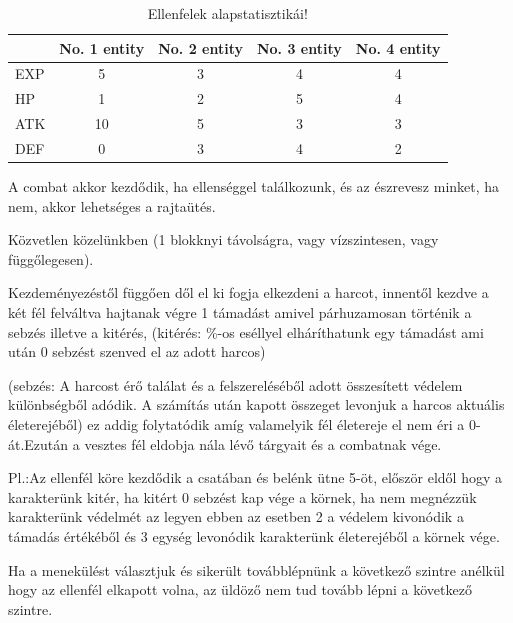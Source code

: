 \begin{table}[h]
\centering
\caption{Ellenfelek alapstatisztikái!}
\label{tab:minta}
\begin{tabular}{|l|c|c|c|c|}
\hline
 & No. 1 entity & No. 2 entity & No. 3 entity & No. 4 entity  \\
\hline
EXP & 5 & 3 & 4 & 4 \\
\hline
HP & 1 & 2 & 5 & 4 \\
\hline
ATK & 10 & 5 & 3 & 3 \\
\hline
DEF & 0 & 3 & 4 & 2 \\
\hline
\end{tabular}
\end{table}


A combat akkor kezdődik, ha ellenséggel találkozunk, és az észrevesz minket, ha nem, akkor lehetséges a rajtaütés.


Közvetlen közelünkben (1 blokknyi távolságra, vagy vízszintesen, vagy függőlegesen).

Kezdeményezéstől függően dől el ki fogja elkezdeni a harcot, innentől kezdve a két fél felváltva hajtanak végre 1 támadást amivel párhuzamosan történik a sebzés illetve a kitérés, (kitérés: \%-os eséllyel elháríthatunk egy támadást ami után 0 sebzést szenved el az adott harcos)

(sebzés: A harcost érő találat és a felszereléséből adott összesített védelem különbségből adódik. A számítás után kapott összeget levonjuk a harcos aktuális életerejéből) ez addig folytatódik amíg valamelyik fél életereje el nem éri a 0-át.Ezután a vesztes fél eldobja nála lévő tárgyait és a combatnak vége.


Pl.:Az ellenfél köre kezdődik a csatában és belénk ütne 5-öt, először eldől hogy a karakterünk kitér, ha kitért 0 sebzést kap vége a körnek, ha nem megnézzük karakterünk védelmét az legyen ebben az esetben 2 a védelem kivonódik a támadás értékéből és 3 egység levonódik karakterünk életerejéből a körnek vége.

Ha a menekülést választjuk és sikerült továbblépnünk a következő szintre anélkül hogy az ellenfél elkapott volna, az üldöző nem tud tovább lépni a következő szintre.


